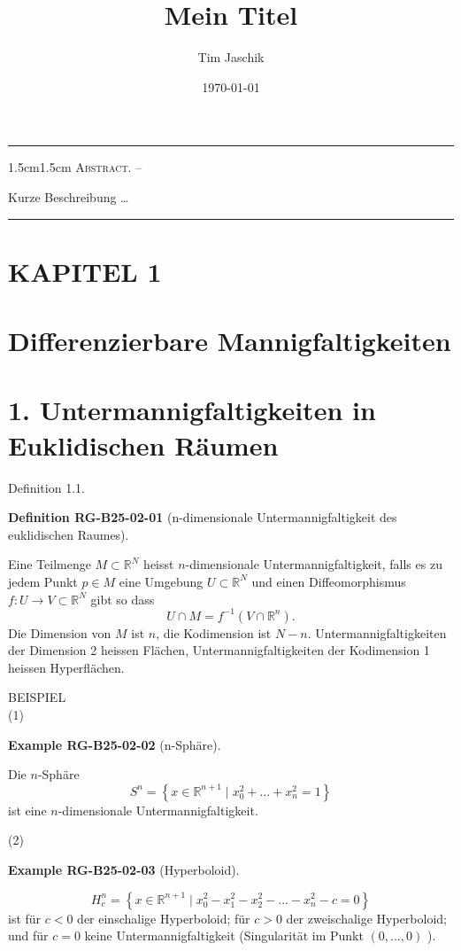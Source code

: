 \documentclass[10pt, letterpaper]{article}
\title{Mein Titel}
\author{Tim Jaschik}
\date{\today}
\renewenvironment{abstract}
  {
    \begin{adjustwidth}{1.5cm}{1.5cm}
    \small
    \textsc{Abstract. –}%
  }
  {
    \end{adjustwidth}
  }
\newcommand{\CustomHeading}[3]{%
  \par\medskip\noindent%
  \textbf{#1 #2} \textnormal{(#3)}.\enskip%
}
\newenvironment{DEF}[2]{\begin{unitbox}\CustomHeading{Definition}{#1}{#2}}{\end{unitbox}}
\newenvironment{EXA}[2]{\begin{unitbox}\CustomHeading{Example}{#1}{#2}}{\end{unitbox}}
\begin{document}
\maketitle
\rule{\textwidth}{0.5pt}
\begin{abstract}
Kurze Beschreibung …
\end{abstract}
\rule{\textwidth}{0.5pt}
\vspace{0.5cm}

\tableofcontents

\pagebreak


\section*{KAPITEL 1}
\section*{Differenzierbare Mannigfaltigkeiten}
\section*{1. Untermannigfaltigkeiten in Euklidischen Räumen}
Definition 1.1. 

\begin{DEF}{RG-B25-02-01}{n-dimensionale Untermannigfaltigkeit des euklidischen Raumes}
Eine Teilmenge $M \subset \mathbb{R}^{N}$ heisst $n$-dimensionale Untermannigfaltigkeit, falls es zu jedem Punkt $p \in M$ eine Umgebung $U \subset \mathbb{R}^{N}$ und einen Diffeomorphismus $f: U \rightarrow V \subset \mathbb{R}^{N}$ gibt so dass
$$
U \cap M=f^{-1}\left(V \cap \mathbb{R}^{n}\right) .
$$
Die Dimension von $M$ ist $n$, die Kodimension ist $N-n$. Untermannigfaltigkeiten der Dimension 2 heissen Flächen, Untermannigfaltigkeiten der Kodimension 1 heissen Hyperflächen.
\end{DEF}



BEISPIEL\\
(1) 


\begin{EXA}{RG-B25-02-02}{n-Sphäre}
Die $n$-Sphäre
$$
S^{n}=\left\{x \in \mathbb{R}^{n+1} \mid x_{0}^{2}+\ldots+x_{n}^{2}=1\right\}
$$
ist eine $n$-dimensionale Untermannigfaltigkeit.
\end{EXA}


(2)

\begin{EXA}{RG-B25-02-03}{Hyperboloid}
$$
H_{c}^{n}=\left\{x \in \mathbb{R}^{n+1} \mid x_{0}^{2}-x_{1}^{2}-x_{2}^{2}-\ldots-x_{n}^{2}-c=0\right\}
$$
ist für $c<0$ der einschalige Hyperboloid; für $c>0$ der zweischalige Hyperboloid; und für $c=0$ keine Untermannigfaltigkeit (Singularität im Punkt $(0, \ldots, 0)$ ).
\end{EXA}
\end{document}
